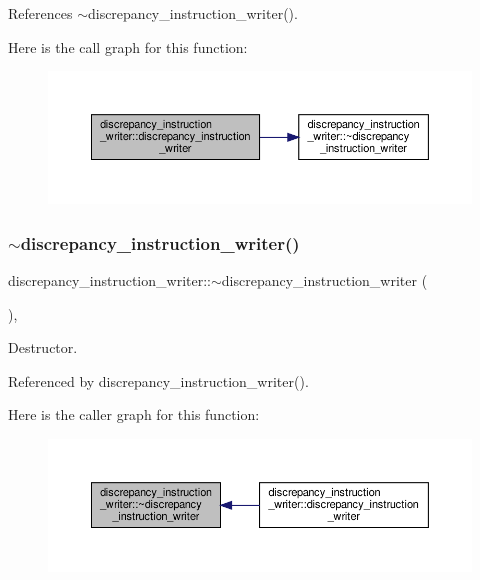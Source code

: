 References $\sim$discrepancy\+\_\+instruction\+\_\+writer().

Here is the call graph for this function\+:
\nopagebreak
\begin{figure}[H]
\begin{center}
\leavevmode
\includegraphics[width=350pt]{d1/d3c/classdiscrepancy__instruction__writer_a563703e6577efd4a025851d7e1f71476_cgraph}
\end{center}
\end{figure}
\mbox{\label{classdiscrepancy__instruction__writer_ac52aa598fff74d0eb54c21ce8a2aa6ca}} 
\subsubsection{\texorpdfstring{$\sim$discrepancy\+\_\+instruction\+\_\+writer()}{~discrepancy\_instruction\_writer()}}
{\footnotesize\ttfamily discrepancy\+\_\+instruction\+\_\+writer\+::$\sim$discrepancy\+\_\+instruction\+\_\+writer (\begin{DoxyParamCaption}{ }\end{DoxyParamCaption})\hspace{0.3cm}{\ttfamily [override]}, {\ttfamily [default]}}



Destructor. 



Referenced by discrepancy\+\_\+instruction\+\_\+writer().

Here is the caller graph for this function\+:
\nopagebreak
\begin{figure}[H]
\begin{center}
\leavevmode
\includegraphics[width=350pt]{d1/d3c/classdiscrepancy__instruction__writer_ac52aa598fff74d0eb54c21ce8a2aa6ca_icgraph}
\end{center}
\end{figure}


